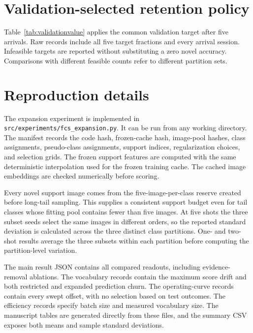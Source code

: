 \documentclass[research]{fcs}
\begin{document}
\FloatBarrier
\section{Validation-selected retention policy}
\label{app:validationpolicy}
\begin{table}[t]
\centering
\caption{Final-session test accuracies after the admission threshold is selected using base validation only. Budgets use the same closed-base validation reference for all methods within a partition. Values are percentages, mean $\pm$ sample standard deviation over feasible partitions; counts identify those partitions. Test accuracies are the outcomes of this operational policy and are not matched by test labels.}
\label{tab:validationvalue}
\small
\end{table}
Table~\ref{tab:validationvalue} applies the common validation target after five arrivals. Raw records include all five target fractions and every arrival session. Infeasible targets are reported without substituting a zero novel accuracy. Comparisons with different feasible counts refer to different partition sets.
\FloatBarrier
\section{Reproduction details}
\label{app:reproduction}
The expansion experiment is implemented in \nolinkurl{src/experiments/fcs_expansion.py}. It can be run from any working directory. The manifest records the code hash, frozen-cache hash, image-pool hashes, class assignments, pseudo-class assignments, support indices, regularization choices, and selection grids. The frozen support features are computed with the same deterministic interpolation used for the frozen training cache. The cached image embeddings are checked numerically before scoring.

Every novel support image comes from the five-image-per-class reserve created before long-tail sampling. This supplies a consistent support budget even for tail classes whose fitting pool contains fewer than five images. At five shots the three subset seeds select the same images in different orders, so the reported standard deviation is calculated across the three distinct class partitions. One- and two-shot results average the three subsets within each partition before computing the partition-level variation.

The main result JSON contains all compared readouts, including evidence-removal ablations. The vocabulary records contain the maximum score drift and both restricted and expanded prediction churn. The operating-curve records contain every swept offset, with no selection based on test outcomes. The efficiency records specify batch size and measured vocabulary size. The manuscript tables are generated directly from these files, and the summary CSV exposes both means and sample standard deviations.
\end{document}
